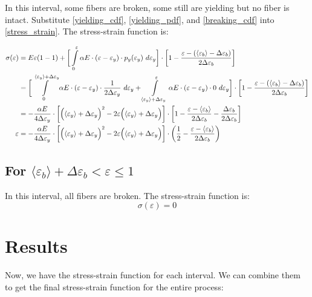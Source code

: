 \documentclass{article}
\newcommand{\eps}{\varepsilon}
\newcommand{\avg}[1]{\langle #1 \rangle}
\newcommand{\dey}{\Delta \varepsilon_y}
\newcommand{\deb}{\Delta \varepsilon_b}
\begin{document}
\indent
In this interval, some fibers are broken, some still are yielding but no fiber is intact. Substitute \eqref{yielding_cdf}, \eqref{yielding_pdf}, and \eqref{breaking_cdf} into \eqref{stress_strain}. The stress-strain function is:

\begin{align}
    \notag
    \sigma(\eps) &= E \eps ( 1 - 1 ) + \bigg[\int\limits_0^\eps \alpha E \cdot (\eps - \eps_y) \cdot p_y(\eps_y) ~ d\eps_y \bigg] \cdot \bigg[ 1 - \frac{\eps - (\avg{\eps_b} - \deb)}{2 \deb} \bigg] \\
    \notag
    &= \bigg[ \int\limits_0^{\avg{\eps_y} + \dey} \alpha E \cdot (\eps - \eps_y) \cdot \frac{1}{2 \dey} ~ d\eps_y + \int\limits_{\avg{\eps_y} + \dey}^\eps \alpha E \cdot (\eps - \eps_y) \cdot 0 ~ d\eps_y \bigg] \cdot \bigg[ 1 - \frac{\eps - (\avg{\eps_b} - \deb)}{2 \deb} \bigg]  \\
    \notag
    &= - \frac{\alpha E}{4 \dey} \cdot \bigg[ \Bigl( \avg{\eps_y} + \dey \Bigr)^2 - 2\eps \Bigl( \avg{\eps_y} + \dey \Bigr) \bigg] \cdot \bigg[ 1 - \frac{\eps - \avg{\eps_b}}{2 \deb} - \frac{\deb}{2 \deb} \bigg] \\
    \eps &= - \frac{\alpha E}{4 \dey} \cdot \bigg[ \Bigl( \avg{\eps_y} + \dey \Bigr)^2 - 2\eps \Bigl( \avg{\eps_y} + \dey \Bigr) \bigg] \cdot \bigg( \frac{1}{2} - \frac{\eps - \avg{\eps_b}}{2 \deb} \bigg)
\end{align}


\subsection{For $\avg{\eps_b} + \deb < \eps \leq 1$}

\indent
In this interval, all fibers are broken. The stress-strain function is:
\begin{equation}
    \sigma(\eps) = 0
\end{equation}


\section{Results}

\indent
Now, we have the stress-strain function for each interval. We can combine them to get the final stress-strain function for the entire process:
\end{document}
